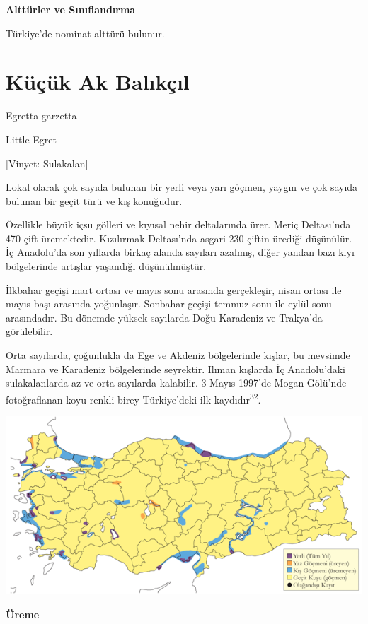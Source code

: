 \documentclass[
  letterpaper,
  DIV=11,
  numbers=noendperiod]{scrreprt}
\begin{document}
\textbf{Alttürler ve Sınıflandırma}

Türkiye'de nominat alttürü bulunur.

\section{Küçük Ak Balıkçıl}\label{kuxfcuxe7uxfck-ak-balux131kuxe7ux131l}

Egretta garzetta

Little Egret

{[}Vinyet: Sulakalan{]}

Lokal olarak çok sayıda bulunan bir yerli veya yarı göçmen, yaygın ve
çok sayıda bulunan bir geçit türü ve kış konuğudur.

Özellikle büyük içsu gölleri ve kıyısal nehir deltalarında ürer. Meriç
Deltası'nda 470 çift üremektedir. Kızılırmak Deltası'nda asgari 230
çiftin ürediği düşünülür. İç Anadolu'da son yıllarda birkaç alanda
sayıları azalmış, diğer yandan bazı kıyı bölgelerinde artışlar yaşandığı
düşünülmüştür.

İlkbahar geçişi mart ortası ve mayıs sonu arasında gerçekleşir, nisan
ortası ile mayıs başı arasında yoğunlaşır. Sonbahar geçişi temmuz sonu
ile eylül sonu arasındadır. Bu dönemde yüksek sayılarda Doğu Karadeniz
ve Trakya'da görülebilir.

Orta sayılarda, çoğunlukla da Ege ve Akdeniz bölgelerinde kışlar, bu
mevsimde Marmara ve Karadeniz bölgelerinde seyrektir. Ilıman kışlarda İç
Anadolu'daki sulakalanlarda az ve orta sayılarda kalabilir. 3 Mayıs
1997'de Mogan Gölü'nde fotoğraflanan koyu renkli birey Türkiye'deki ilk
kaydıdır\textsuperscript{32}.

\includegraphics{images/harita_Page_072.png}

\textbf{Üreme}
\end{document}
